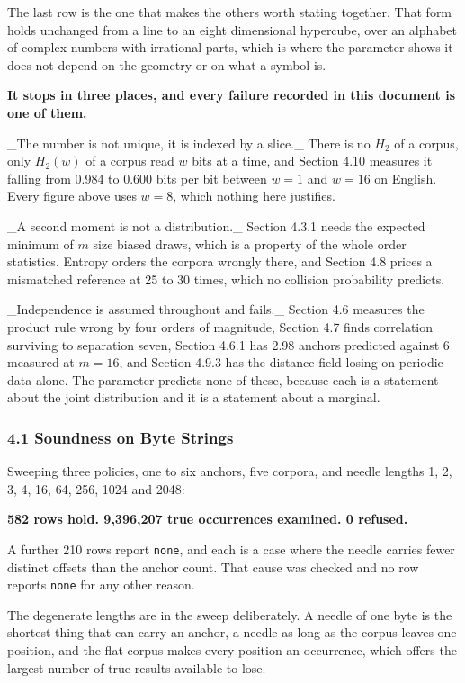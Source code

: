 The last row is the one that makes the others worth stating together. That form holds unchanged from a line to an eight dimensional hypercube, over an alphabet of complex numbers with irrational parts, which is where the parameter shows it does not depend on the geometry or on what a symbol is.

\textbf{It stops in three places, and every failure recorded in this document is one of them.}

\_The number is not unique, it is indexed by a slice.\_ There is no \(H_2\) of a corpus, only \(H_2(w)\) of a corpus read \(w\) bits at a time, and Section 4.10 measures it falling from 0.984 to 0.600 bits per bit between \(w = 1\) and \(w = 16\) on English. Every figure above uses \(w = 8\), which nothing here justifies.

\_A second moment is not a distribution.\_ Section 4.3.1 needs the expected minimum of \(m\) size biased draws, which is a property of the whole order statistics. Entropy orders the corpora wrongly there, and Section 4.8 prices a mismatched reference at 25 to 30 times, which no collision probability predicts.

\_Independence is assumed throughout and fails.\_ Section 4.6 measures the product rule wrong by four orders of magnitude, Section 4.7 finds correlation surviving to separation seven, Section 4.6.1 has 2.98 anchors predicted against 6 measured at \(m = 16\), and Section 4.9.3 has the distance field losing on periodic data alone. The parameter predicts none of these, because each is a statement about the joint distribution and it is a statement about a marginal.

\subsubsection{4.1 Soundness on Byte Strings}

Sweeping three policies, one to six anchors, five corpora, and needle lengths 1, 2, 3, 4, 16, 64, 256, 1024 and 2048:

\textbf{582 rows hold. 9,396,207 true occurrences examined. 0 refused.}

A further 210 rows report \texttt{none}, and each is a case where the needle carries fewer distinct offsets than the anchor count. That cause was checked and no row reports \texttt{none} for any other reason.

The degenerate lengths are in the sweep deliberately. A needle of one byte is the shortest thing that can carry an anchor, a needle as long as the corpus leaves one position, and the flat corpus makes every position an occurrence, which offers the largest number of true results available to lose.

